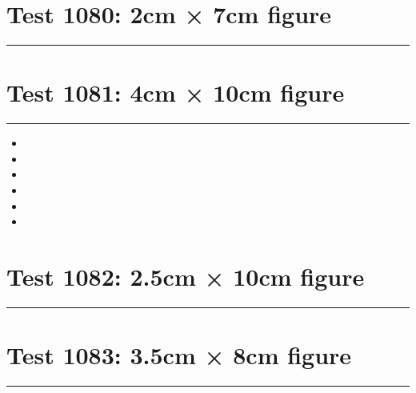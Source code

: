 \documentclass[a4paper,11pt]{article}
\begin{document}
\section*{Test 1080: 2cm × 7cm figure}
\begin{swarmwrap}%
  \begin{minipage}[t]{2cm}
    \centering
    \rule{\linewidth}{7cm}
  \end{minipage}%
\end{swarmwrap}%
\swarmwrapnext
\lipsum[28]
\lipsum[29]
\lipsum[30]
\lipsum[31]
\lipsum[32]
\lipsum[33]
\section*{Test 1081: 4cm × 10cm figure}
\begin{swarmwrap}%
  \begin{minipage}[t]{4cm}
    \centering
    \rule{\linewidth}{10cm}
  \end{minipage}%
\end{swarmwrap}%
\swarmwrapnext
\lipsum[144]
\begin{itemize}
  \item \lipsum[145][1-3]
  \item \lipsum[146][1-3]
  \item \lipsum[147][1-3]
  \item \lipsum[148][1-3]
  \item \lipsum[149][1-3]
  \item \lipsum[150][1-3]
\end{itemize}
\section*{Test 1082: 2.5cm × 10cm figure}
\begin{swarmwrap}%
  \begin{minipage}[t]{2cm}
    \centering
    \rule{\linewidth}{10cm}
  \end{minipage}%
\end{swarmwrap}%
\swarmwrapnext
\lipsum[14]
\lipsum[15]
\lipsum[16]
\lipsum[17]
\lipsum[18]
\section*{Test 1083: 3.5cm × 8cm figure}
\begin{swarmwrap}%
  \begin{minipage}[t]{3cm}
    \centering
    \rule{\linewidth}{8cm}
  \end{minipage}%
\end{swarmwrap}%
\swarmwrapnext
\lipsum[82]
\lipsum[83]
\lipsum[84]
\lipsum[85]
\lipsum[86]
\lipsum[87]
\end{document}
